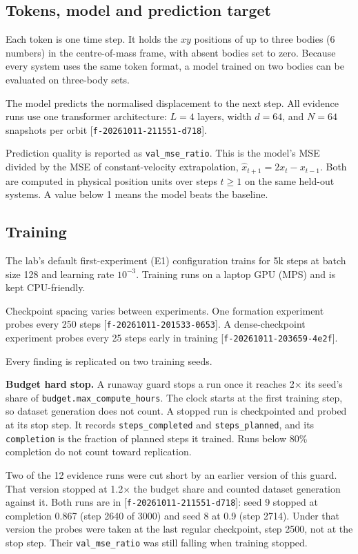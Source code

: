 \documentclass{article}
\begin{document}
\subsection{Tokens, model and prediction target}

Each token is one time step. It holds the $xy$ positions of up to three bodies (6 numbers) in the centre-of-mass frame, with absent bodies set to zero. Because every system uses the same token format, a model trained on two bodies can be evaluated on three-body sets.

The model predicts the normalised displacement to the next step. All evidence runs use one transformer architecture: $L = 4$ layers, width $d = 64$, and $N = 64$ snapshots per orbit [\texttt{f-20261011-211551-d718}].

Prediction quality is reported as \texttt{val\_mse\_ratio}. This is the model's MSE divided by the MSE of constant-velocity extrapolation, $\hat{x}_{t+1} = 2x_t - x_{t-1}$. Both are computed in physical position units over steps $t \geq 1$ on the same held-out systems. A value below 1 means the model beats the baseline.

\subsection{Training}

The lab's default first-experiment (E1) configuration trains for 5k steps at batch size 128 and learning rate $10^{-3}$. Training runs on a laptop GPU (MPS) and is kept CPU-friendly.

Checkpoint spacing varies between experiments. One formation experiment probes every 250 steps [\texttt{f-20261011-201533-0653}]. A dense-checkpoint experiment probes every 25 steps early in training [\texttt{f-20261011-203659-4e2f}].

Every finding is replicated on two training seeds.

\textbf{Budget hard stop.} A runaway guard stops a run once it reaches 2× its seed's share of \texttt{budget.max\_compute\_hours}. The clock starts at the first training step, so dataset generation does not count. A stopped run is checkpointed and probed at its stop step. It records \texttt{steps\_completed} and \texttt{steps\_planned}, and its \texttt{completion} is the fraction of planned steps it trained. Runs below 80\% completion do not count toward replication.

Two of the 12 evidence runs were cut short by an earlier version of this guard. That version stopped at 1.2× the budget share and counted dataset generation against it. Both runs are in [\texttt{f-20261011-211551-d718}]: seed 9 stopped at completion 0.867 (step 2640 of 3000) and seed 8 at 0.9 (step 2714). Under that version the probes were taken at the last regular checkpoint, step 2500, not at the stop step. Their \texttt{val\_mse\_ratio} was still falling when training stopped.
\end{document}
